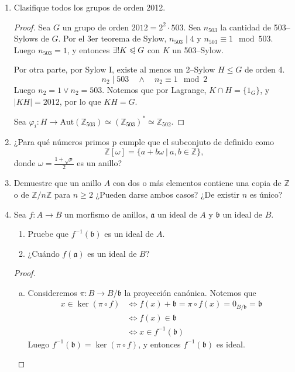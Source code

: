 \documentclass{article}
\theoremstyle{definition}
\theoremstyle{remark}
\numberwithin{equation}{section}
\newcommand{\Z}{\mathbb{Z}}
\newcommand{\vphi}{\varphi}
\renewcommand{\c}{\cdot}
\newcommand{\normal}{\trianglelefteqslant}
\newcommand{\Aut}{\mathrm{Aut}}
\newcommand{\abs}[1]{\left| #1 \right|}
\begin{document}
\begin{enumerate}
    
\item Clasifique todos los grupos de orden 2012.
\begin{proof}
  Sea $G$ un grupo de orden $2012 = 2^2 \c 503$. Sea $n_{503}$ la cantidad de 503--Sylows de $G$. Por el 3er teorema de Sylow, $n_{503} \mid 4$ y $n_{503} \equiv 1 \mod{503}$. Luego $n_{503} = 1$, y entonces $\exists! K \normal G$ con $K$ un 503--Sylow.

  Por otra parte, por Sylow I, existe al menos un 2--Sylow $H \leqslant G$ de orden 4. 
  \[ n_2 \mid 503 \quad\land\quad n_2 \equiv 1 \mod2 \]
  Luego $n_2 = 1 \lor n_2 = 503$. Notemos que por Lagrange, $K \cap H = \{1_G\}$, y $\abs{KH} = 2012$, por lo que $KH = G$.

  Sea $\vphi_i \colon H \to \Aut(\Z_{503}) \simeq (\Z_{503})^* \simeq \Z_{502}$.
\end{proof}

\item ¿Para qué números primos p cumple que el subconjuto de definido como
$$\mathbb{Z}[\omega] = \{a+ b\omega \ |\ a,b \in \mathbb{Z}\},$$
donde $\omega= \tfrac{1 + \sqrt{p}}{2}$ es un anillo?

\item Demuestre que un anillo $A$ con dos o más elementos contiene una copia de $\mathbb{Z}$ o de $\mathbb{Z}/n\mathbb{Z}$ para $n \geq 2$ ¿Pueden darse ambos casos? ¿De existir $n$ es único?

\item Sea $f : A\to B$ un morfismo de anillos, $\mathfrak{a}$ un ideal de $A$ y $\mathfrak{b}$ un ideal de $B$.

\begin{enumerate}
    \item Pruebe que $f^{-1}(\mathfrak{b})$ es un ideal de $A$.
    \item ¿Cuándo $f(\mathfrak{a})$ es un ideal de $B$?
\end{enumerate}
\begin{proof}
  \ 
  \begin{enumerate}[(a)]
    \item Consideremos $\pi \colon B \to B/\mathfrak{b}$ la proyección canónica. Notemos que 
    \begin{align*}
        x \in \ker(\pi \circ f)
        &\iff f(x) + \mathfrak{b } = \pi \circ f(x) = 0_{B/\mathfrak{b}} = \mathfrak{b } \\
        &\iff f(x) \in \mathfrak{b } \\
        &\iff x \in f^{-1}(\mathfrak{b })
    \end{align*}
    Luego $f^{-1}(\mathfrak{b }) = \ker(\pi \circ f)$, y entonces $f^{-1}(\mathfrak{b})$ es ideal.


\end{enumerate}
\end{proof}
\end{enumerate}
\end{document}
